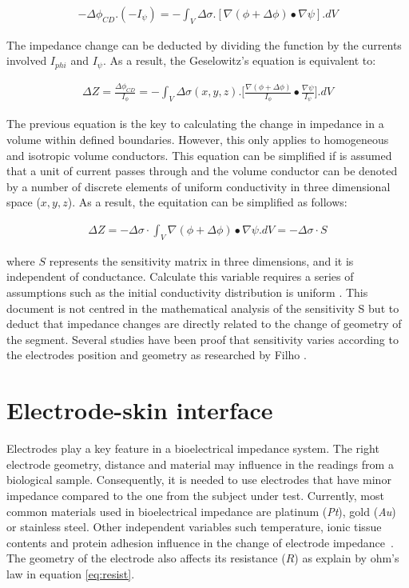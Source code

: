 \begin{align}
	\label{eq:potential field2}
	- \Delta \phi_{CD} . (-I_{\psi}) = - \int_{V} \Delta \sigma . [\nabla (\phi + \Delta \phi) \bullet \nabla \psi].dV
\end{align}

The impedance change can be deducted by dividing the function by the currents involved $I_{phi}$ and $I_{\psi}$. As a result, the Geselowitz’s equation is equivalent to:

\begin{align}
	\label{eq:Geselowitz}
	\Delta Z = \frac{\Delta \phi_{CD}}{I_\phi} = - \int_V \Delta \sigma (x,y,z).\bigg[\frac{\nabla(\phi + \Delta \phi)}{I_{\phi}} \bullet \frac{\nabla \psi}{I_{\psi}}\bigg].dV
\end{align}

The previous equation is the key to calculating the change in impedance in a volume within defined boundaries. However, this only applies to homogeneous and isotropic volume conductors. This equation can be simplified if is assumed that a unit of current passes through and the volume conductor can be denoted by a number of discrete elements of uniform conductivity in three dimensional space ($x,y,z$). As a result, the equitation can be simplified as follows:

\begin{align}
	\label{eq:Geselowitz2}
	\Delta Z = - \Delta \sigma \cdot \int_V \nabla(\phi + \Delta \phi) \bullet \nabla \psi . dV = - \Delta \sigma \cdot S
\end{align}

where $S$ represents the sensitivity matrix in three dimensions, and it is independent of conductance. Calculate this variable requires a series of assumptions such as the initial conductivity distribution is uniform \cite{dehghani1999incorporating}. This document is not centred in the mathematical analysis of the sensitivity S but to deduct that impedance changes are directly related to the change of geometry of the segment. Several studies have been proof that sensitivity varies according to the electrodes position and geometry as researched by Filho \cite{bertemes2002tissue}.

\section{Electrode-skin interface}  %
\label{section impedance electrodes}
Electrodes play a key feature in a bioelectrical impedance system. The right electrode geometry, distance and material may influence in the readings from a biological sample. Consequently, it is needed to use electrodes that have minor impedance compared to the one from the subject under test. Currently, most common materials used in bioelectrical impedance are platinum (\textit{Pt}), gold (\textit{Au}) or stainless steel. Other independent variables such temperature, ionic tissue contents and protein adhesion influence in the change of electrode impedance~\cite{ivorra2003bioimpedance,martinsen2011bioimpedance}. The geometry of the electrode also affects its resistance ($R$) as explain by ohm’s law in equation \ref{eq:resist}.

